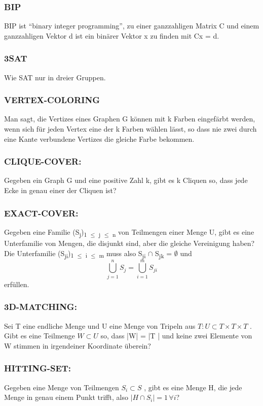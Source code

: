 \documentclass[11pt,twoside,landscape]{article}
\begin{document}
\begin{multicols}{3}
\subsubsection*{BIP}
\label{sec:org3c8c81d}
BIP ist “binary integer programming”, zu einer ganzzahligen Matrix C und einem ganzzahligen Vektor d ist ein binärer Vektor x zu finden mit Cx = d.
\subsubsection*{3SAT}
\label{sec:orgf0219f7}
Wie SAT nur in dreier Gruppen.
\subsubsection*{VERTEX-COLORING}
\label{sec:org91eaaaf}
Man sagt, die Vertizes eines Graphen G können mit k Farben eingefärbt werden, wenn sich für jeden Vertex eine der k Farben wählen lässt, so dass nie zwei durch eine Kante verbundene Vertizes die gleiche Farbe bekommen.
\subsubsection*{CLIQUE-COVER:}
\label{sec:orgaf7c790}
Gegeben ein Graph G und eine positive Zahl k, gibt es k Cliquen so, dass jede Ecke in genau einer der Cliquen ist?

\subsubsection*{EXACT-COVER:}
\label{sec:org11e46fe}
Gegeben eine Familie (S\textsubscript{j})\textsubscript{1 \(\le\) j \(\le\) n} von Teilmengen einer Menge U, gibt es eine Unterfamilie von Mengen, die disjunkt sind, aber die gleiche Vereinigung haben? Die Unterfamilie (S\textsubscript{ji})\textsubscript{1 \(\le\) i \(\le\) m} muss also S\textsubscript{ji} \(\cap\) S\textsubscript{jk} = \(\emptyset\) und
$$
\bigcup^n_{j=1} S_j = \bigcup^m_{i=1} S_{ji}
$$
erfüllen.

\subsubsection*{3D-MATCHING:}
\label{sec:orgb293fcc}
Sei T eine endliche Menge und U eine Menge von Tripeln aus \(T: U \subset T \times T \times T\) . Gibt es eine Teilmenge \(W \subset U\) so, dass |W| = |T | und keine zwei Elemente von W stimmen in irgendeiner Koordinate überein?

\subsubsection*{HITTING-SET:}
\label{sec:org3dc031c}
Gegeben eine Menge von Teilmengen \(S_i \subset S\) , gibt es eine Menge H, die jede Menge in genau einem Punkt trifft, also \(|H \cap S_i | = 1 \, \forall i\)?


\end{multicols}
\end{document}
